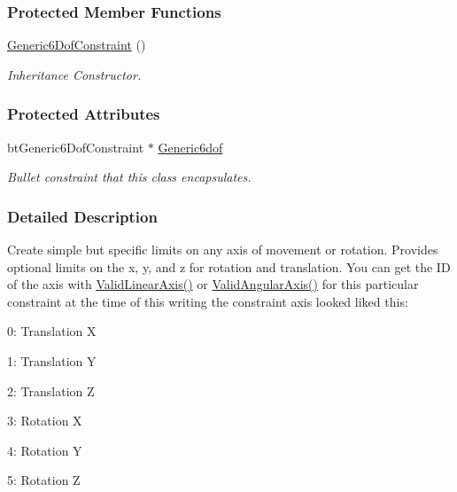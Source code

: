 \subsubsection*{Protected Member Functions}
\begin{DoxyCompactItemize}
\item 
\hyperlink{classMezzanine_1_1Generic6DofConstraint_ab950948993dc96cc088d94197f35a40d}{Generic6DofConstraint} ()
\begin{DoxyCompactList}\small\item\em Inheritance Constructor. \item\end{DoxyCompactList}\end{DoxyCompactItemize}
\subsubsection*{Protected Attributes}
\begin{DoxyCompactItemize}
\item 
\hypertarget{classMezzanine_1_1Generic6DofConstraint_abb10648cdb6987566223724d20de0b51}{
btGeneric6DofConstraint $\ast$ \hyperlink{classMezzanine_1_1Generic6DofConstraint_abb10648cdb6987566223724d20de0b51}{Generic6dof}}
\label{classMezzanine_1_1Generic6DofConstraint_abb10648cdb6987566223724d20de0b51}

\begin{DoxyCompactList}\small\item\em Bullet constraint that this class encapsulates. \item\end{DoxyCompactList}\end{DoxyCompactItemize}


\subsubsection{Detailed Description}
Create simple but specific limits on any axis of movement or rotation. Provides optional limits on the x, y, and z for rotation and translation. You can get the ID of the axis with \hyperlink{classMezzanine_1_1Generic6DofConstraint_a94db83422c1984cdbe1745662715ac9d}{ValidLinearAxis()} or \hyperlink{classMezzanine_1_1Generic6DofConstraint_a8a908f5f3857262db217a7f2dfc25c61}{ValidAngularAxis()} for this particular constraint at the time of this writing the constraint axis looked liked this:
\begin{DoxyItemize}
\item 0: Translation X
\item 1: Translation Y
\item 2: Translation Z
\item 3: Rotation X
\item 4: Rotation Y
\item 5: Rotation Z
\end{DoxyItemize}

